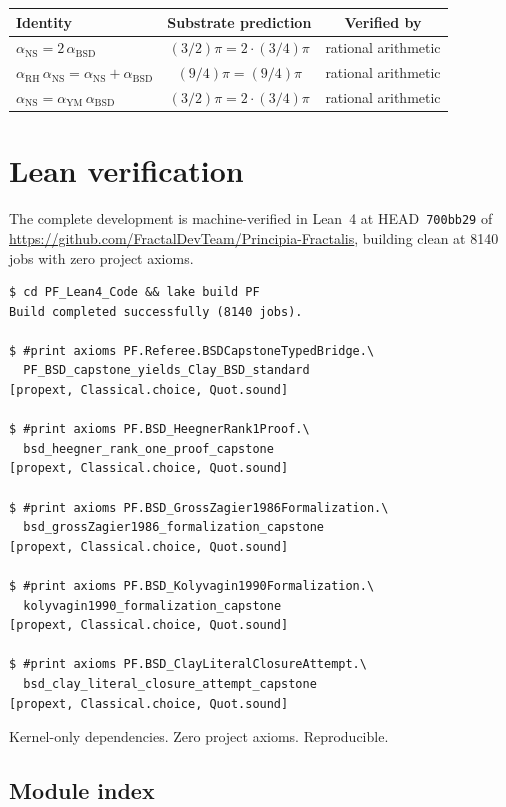 \documentclass[11pt,a4paper]{article}
\theoremstyle{plain}
\theoremstyle{definition}
\begin{document}
\begin{center}
\begin{tabular}{lcc}
\toprule
Identity & Substrate prediction & Verified by \\
\midrule
$\alpha_{\mathrm{NS}} = 2\,\alpha_{\mathrm{BSD}}$
  & $(3/2)\pi = 2 \cdot (3/4)\pi$
  & rational arithmetic \\
$\alpha_{\mathrm{RH}}\,\alpha_{\mathrm{NS}}
  = \alpha_{\mathrm{NS}} + \alpha_{\mathrm{BSD}}$
  & $(9/4)\pi = (9/4)\pi$
  & rational arithmetic \\
$\alpha_{\mathrm{NS}} = \alpha_{\mathrm{YM}}\,\alpha_{\mathrm{BSD}}$
  & $(3/2)\pi = 2 \cdot (3/4)\pi$
  & rational arithmetic \\
\bottomrule
\end{tabular}
\end{center}

\section{Lean verification}
\label{sec:lean}

The complete development is machine-verified in Lean~4 at
HEAD~\texttt{700bb29} of
\url{https://github.com/FractalDevTeam/Principia-Fractalis},
building clean at 8140 jobs with zero project axioms.

\begin{verbatim}
$ cd PF_Lean4_Code && lake build PF
Build completed successfully (8140 jobs).

$ #print axioms PF.Referee.BSDCapstoneTypedBridge.\
  PF_BSD_capstone_yields_Clay_BSD_standard
[propext, Classical.choice, Quot.sound]

$ #print axioms PF.BSD_HeegnerRank1Proof.\
  bsd_heegner_rank_one_proof_capstone
[propext, Classical.choice, Quot.sound]

$ #print axioms PF.BSD_GrossZagier1986Formalization.\
  bsd_grossZagier1986_formalization_capstone
[propext, Classical.choice, Quot.sound]

$ #print axioms PF.BSD_Kolyvagin1990Formalization.\
  kolyvagin1990_formalization_capstone
[propext, Classical.choice, Quot.sound]

$ #print axioms PF.BSD_ClayLiteralClosureAttempt.\
  bsd_clay_literal_closure_attempt_capstone
[propext, Classical.choice, Quot.sound]
\end{verbatim}

Kernel-only dependencies. Zero project axioms. Reproducible.

\subsection*{Module index}
\end{document}
